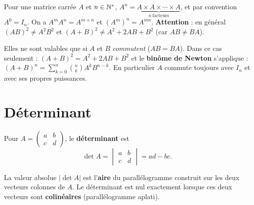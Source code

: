\begin{definition}
Pour une matrice carrée $A$ et $n\in\mathbb{N}^*$, $A^{n}=\underbrace{A\times A\times\cdots\times A}_{n\ \text{facteurs}}$,
et par convention $A^{0}=I_n$. On a $A^{m}A^{n}=A^{m+n}$ et $(A^{m})^{n}=A^{mn}$.
\textbf{Attention} : en général $(AB)^2\neq A^2B^2$ et $(A+B)^2\neq A^2+2AB+B^2$ (car $AB\neq BA$).
\end{definition}

\begin{remarque}
Elles ne sont valables que si $A$ et $B$ \emph{commutent} ($AB=BA$). Dans ce cas seulement :
$(A+B)^2=A^2+2AB+B^2$ et le \textbf{binôme de Newton} s'applique :
$\displaystyle(A+B)^n=\sum_{k=0}^{n}\binom nk A^k B^{n-k}$. En particulier $A$ commute toujours
avec $I_n$ et avec ses propres puissances.
\end{remarque}

\section{Déterminant}

\begin{definition}
Pour $A=\begin{pmatrix}a&b\\c&d\end{pmatrix}$, le \textbf{déterminant} est
\[
\det A=\begin{vmatrix}a&b\\c&d\end{vmatrix}=ad-bc.
\]
\end{definition}

\begin{remarque}
La valeur absolue $|\det A|$ est l'\textbf{aire} du parallélogramme construit sur les deux vecteurs
colonnes de $A$. Le déterminant est nul exactement lorsque ces deux vecteurs sont
\textbf{colinéaires} (parallélogramme aplati).
\end{remarque}

\begin{illus}
\end{illus}

